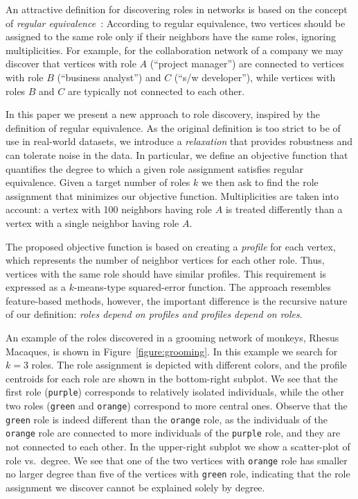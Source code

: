 An attractive definition for 
discovering roles in networks is based on the concept of
\emph{regular equivalence}~\cite{everett1994regular,white1983graph}:
According to regular equivalence, 
two vertices should be assigned to the same role
only if their neighbors have the same roles, ignoring multiplicities.
For example, 
for the collaboration network of a company
we may discover 
that vertices with role $A$ (``project manager'')
are connected to vertices with role 
$B$ (``business analyst'') and $C$ (``s/w developer''), 
while vertices with roles $B$ and $C$ are typically not connected to each other. 

\smallskip
In this paper we present a new approach to role discovery, 
inspired by the definition of regular equivalence.
As the original definition is too strict to be of use in real-world datasets, 
we introduce a \emph{relaxation} that provides robustness and can tolerate noise in the data.
In particular, we define an objective function that quantifies
the degree to which a given role assignment 
satisfies regular equivalence.
Given a target number of roles $k$
we then ask to find the role assignment that minimizes our objective function.
Multiplicities are taken into account: a vertex with 100 neighbors having role $A$
is treated differently than a vertex with a single neighbor having role $A$.



The proposed objective function is based on creating a \emph{profile} for each vertex, 
which represents the number of neighbor vertices for each other role.
Thus, vertices with the same role should have similar profiles.
This requirement is expressed as a $k$-means-type squared-error function. 
The approach resembles feature-based methods,
however, the important difference is the recursive nature of our definition: 
\emph{roles depend on profiles and profiles depend on roles}. 

An example of the roles discovered in a grooming network
of monkeys, Rhesus Macaques, 
is shown in Figure~\ref{figure:grooming}. 
In this example we search for $k=3$ roles. 
The role assignment is depicted with different colors, 
and the profile centroids for each role are shown in the bottom-right subplot.
We see that the first role ({\tt purple}) corresponds to relatively isolated individuals, 
while the other two roles ({\tt green} and {\tt orange}) correspond to more central ones. 
Observe that the {\tt green} role is indeed different than the {\tt orange} role,
as the individuals of the {\tt orange} role are connected to more individuals of the {\tt purple} role, 
and they are not connected to each other. 
In the upper-right subplot we show a scatter-plot of role vs.\ degree. 
We see that one of the two vertices with {\tt orange} role
has smaller no larger degree than five of the vertices with {\tt green} role, 
indicating that the role assignment we discover cannot be explained solely by degree. 

